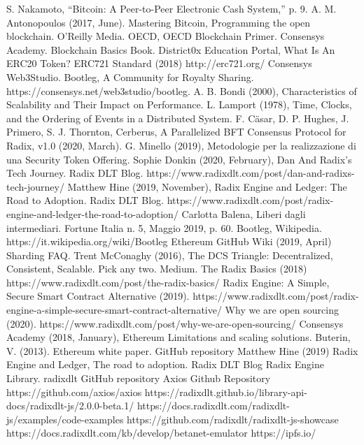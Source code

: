 \begin{thebibliography}{90}             %

 S. Nakamoto, “Bitcoin: A Peer-to-Peer Electronic Cash System,” p. 9.
 A. M. Antonopoulos (2017, June). Mastering Bitcoin, Programming the open blockchain. O'Reilly Media.
 OECD, OECD Blockchain Primer.
 Consensys Academy. Blockchain Basics Book.
 District0x Education Portal, What Is An ERC20 Token?
 ERC721 Standard (2018) http://erc721.org/
 Consensys Web3Studio. Bootleg, A Community for Royalty Sharing. https://consensys.net/web3studio/bootleg.
 A. B. Bondi (2000), Characteristics of Scalability and Their Impact on Performance.
 L. Lamport (1978), Time, Clocks, and the Ordering of Events in a Distributed System.
 F. C{\"a}sar, D. P. Hughes, J. Primero, S. J. Thornton, Cerberus, A Parallelized BFT Consensus Protocol for Radix, v1.0 (2020, March).
 G. Minello (2019), Metodologie per la realizzazione di una Security Token Offering.
 Sophie Donkin (2020, February), Dan And Radix's Tech Journey. Radix DLT Blog. https://www.radixdlt.com/post/dan-and-radixs-tech-journey/
 Matthew Hine (2019, November), Radix Engine and Ledger: The Road to Adoption. Radix DLT Blog. https://www.radixdlt.com/post/radix-engine-and-ledger-the-road-to-adoption/
 Carlotta Balena, Liberi dagli intermediari. Fortune Italia n. 5, Maggio 2019, p. 60.
 Bootleg, Wikipedia.  https://it.wikipedia.org/wiki/Bootleg
 Ethereum GitHub Wiki (2019, April) Sharding FAQ.
 Trent McConaghy (2016), The DCS Triangle: Decentralized, Consistent, Scalable. Pick any two. Medium.
 The Radix Basics (2018) https://www.radixdlt.com/post/the-radix-basics/
 Radix Engine: A Simple, Secure Smart Contract Alternative (2019). https://www.radixdlt.com/post/radix-engine-a-simple-secure-smart-contract-alternative/
 Why we are open sourcing (2020). https://www.radixdlt.com/post/why-we-are-open-sourcing/
 Consensys Academy (2018, January), Ethereum Limitations and scaling solutions.
 Buterin, V. (2013). Ethereum white paper. GitHub repository
 Matthew Hine (2019) Radix Engine and Ledger, The road to adoption. Radix DLT Blog
 Radix Engine Library. radixdlt GitHub repository
 Axios Github Repository https://github.com/axios/axios
 https://radixdlt.github.io/library-api-docs/radixdlt-js/2.0.0-beta.1/
 https://docs.radixdlt.com/radixdlt-js/examples/code-examples
 https://github.com/radixdlt/radixdlt-js-showcase
 https://docs.radixdlt.com/kb/develop/betanet-emulator
 https://ipfs.io/

\end{thebibliography}